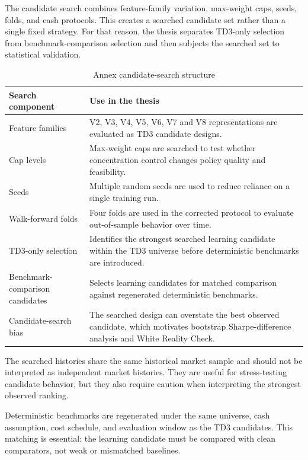 \documentclass[12pt]{article}
\begin{document}

The candidate search combines feature-family variation, max-weight caps, seeds, folds, and cash protocols. This creates a searched candidate set rather than a single fixed strategy. For that reason, the thesis separates TD3-only selection from benchmark-comparison selection and then subjects the searched set to statistical validation.

\begin{table}[H]
\centering
\caption{Annex candidate-search structure}
\scriptsize
\begin{tabularx}{\textwidth}{L{0.26\textwidth}Y}
\toprule
\textbf{Search component} & \textbf{Use in the thesis} \\
\midrule
Feature families & V2, V3, V4, V5, V6, V7 and V8 representations are evaluated as TD3 candidate designs. \\
Cap levels & Max-weight caps are searched to test whether concentration control changes policy quality and feasibility. \\
Seeds & Multiple random seeds are used to reduce reliance on a single training run. \\
Walk-forward folds & Four folds are used in the corrected protocol to evaluate out-of-sample behavior over time. \\
TD3-only selection & Identifies the strongest searched learning candidate within the TD3 universe before deterministic benchmarks are introduced. \\
Benchmark-comparison candidates & Selects learning candidates for matched comparison against regenerated deterministic benchmarks. \\
Candidate-search bias & The searched design can overstate the best observed candidate, which motivates bootstrap Sharpe-difference analysis and White Reality Check. \\
\bottomrule
\end{tabularx}
\end{table}

The searched histories share the same historical market sample and should not be interpreted as independent market histories. They are useful for stress-testing candidate behavior, but they also require caution when interpreting the strongest observed ranking.


Deterministic benchmarks are regenerated under the same universe, cash assumption, cost schedule, and evaluation window as the TD3 candidates. This matching is essential: the learning candidate must be compared with clean comparators, not weak or mismatched baselines.
\end{document}
